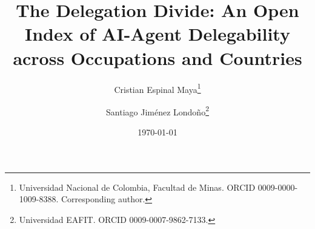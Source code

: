 \documentclass[11pt]{article}
\title{The Delegation Divide: An Open Index of AI-Agent Delegability across Occupations and Countries}
\author{Cristian Espinal Maya\thanks{Universidad Nacional de Colombia, Facultad de Minas. ORCID 0009-0000-1009-8388. Corresponding author.}
  \and Santiago Jim\'enez Londo\~no\thanks{Universidad EAFIT. ORCID 0009-0007-9862-7133.}}
\date{\today}
\begin{document}
\maketitle
\begin{abstract}\end{abstract}











\appendix



\end{document}

